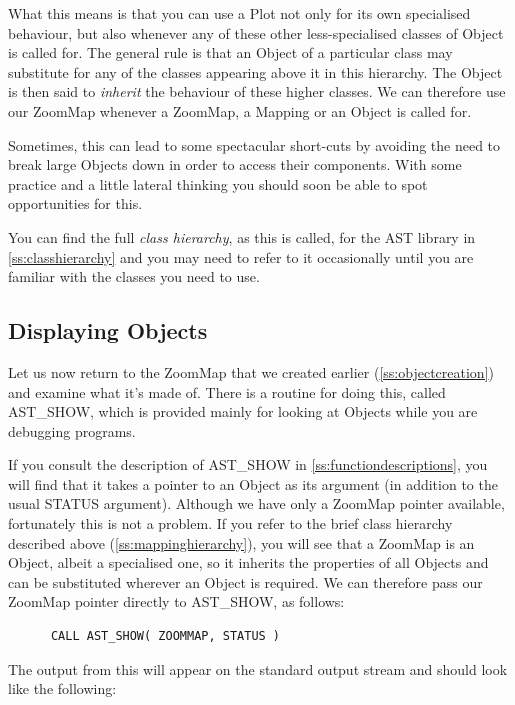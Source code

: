 \documentclass[twoside,11pt]{article}
\newcommand{\htmlref}[2]{#1}
\newcommand{\appref}[1]{Appendix~\ref{#1}}
\newcommand{\secref}[1]{\S\ref{#1}}
\renewcommand{\appref}[1]{\ref{#1}}
\renewcommand{\secref}[1]{\ref{#1}}
\begin{document}
What this means is that you can use a Plot not only for its own
specialised behaviour, but also whenever any of these other
less-specialised classes of Object is called for. The general rule is
that an Object of a particular class may substitute for any of the
classes appearing above it in this hierarchy. The Object is then said
to {\em{inherit}} the behaviour of these higher classes. We can
therefore use our ZoomMap whenever a ZoomMap, a Mapping or an Object
is called for.

Sometimes, this can lead to some spectacular short-cuts by avoiding
the need to break large Objects down in order to access their
components. With some practice and a little lateral thinking you
should soon be able to spot opportunities for this.

You can find the full {\em{class hierarchy}}, as this is called, for
the AST library in \appref{ss:classhierarchy} and you may need to
refer to it occasionally until you are familiar with the classes you
need to use.

\subsection{\label{ss:displayingobjects}Displaying Objects}

Let us now return to the \htmlref{ZoomMap}{ZoomMap} that we created earlier
(\secref{ss:objectcreation}) and examine what it's made of.
There is a routine for doing this, called \htmlref{AST\_SHOW}{AST_SHOW}, which is provided
mainly for looking at Objects while you are debugging programs.

If you consult the description of AST\_SHOW in
\appref{ss:functiondescriptions}, you will find that it takes a
pointer to an \htmlref{Object}{Object} as its argument (in addition to the usual STATUS
argument). Although we have only a ZoomMap pointer available,
fortunately this is not a problem. If you refer to the brief class
hierarchy described above (\secref{ss:mappinghierarchy}), you will see
that a ZoomMap is an Object, albeit a specialised one, so it inherits
the properties of all Objects and can be substituted wherever an
Object is required.  We can therefore pass our ZoomMap pointer
directly to AST\_SHOW, as follows:

\small
\begin{verbatim}
      CALL AST_SHOW( ZOOMMAP, STATUS )
\end{verbatim}
\normalsize

The output from this will appear on the standard output stream and
should look like the following:
\end{document}

